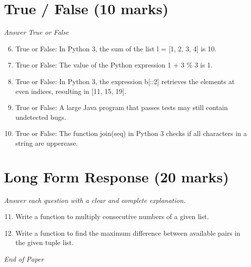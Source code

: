 \documentclass[12pt]{article}
\begin{document}
\section*{True / False (10 marks)}
\textit{Answer True or False}
\begin{enumerate}[label=\arabic*.]
\setcounter{enumi}{5}
\item True or False: In Python 3, the sum of the list l = [1, 2, 3, 4] is 10.
\item True or False: The value of the Python expression 1 + 3 \% 3 is 1.
\item True or False: In Python 3, the expression b[::2] retrieves the elements at even indices, resulting in [11, 15, 19].
\item True or False: A large Java program that passes tests may still contain undetected bugs.
\item True or False: The function join(seq) in Python 3 checks if all characters in a string are uppercase.
\end{enumerate}

\section*{Long Form Response (20 marks)}
\textit{Answer each question with a clear and complete explanation.}
\begin{enumerate}[label=\arabic*.]
\setcounter{enumi}{10}
\item Write a function to multiply consecutive numbers of a given list.
\item Write a function to find the maximum difference between available pairs in the given tuple list.
\end{enumerate}

\vfill
\noindent\textit{End of Paper}
\end{document}

